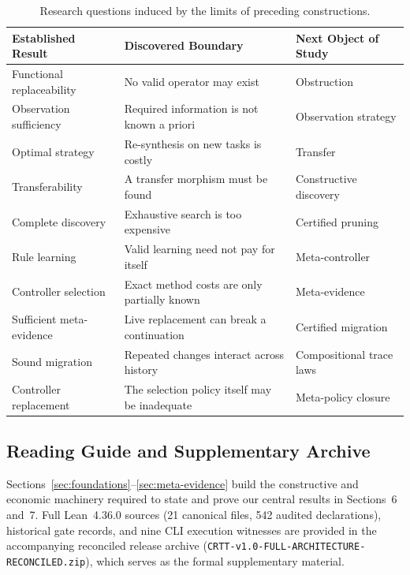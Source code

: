 \documentclass[10pt,letterpaper]{article}
\begin{document}
\begin{table}[h]
\centering
\footnotesize
\begin{tabular}{@{}p{3.6cm}p{5.2cm}p{4.6cm}@{}}
\toprule
\textbf{Established Result} & \textbf{Discovered Boundary} & \textbf{Next Object of Study} \\
\midrule
Functional replaceability & No valid operator may exist & Obstruction \\
Observation sufficiency & Required information is not known a priori & Observation strategy \\
Optimal strategy & Re-synthesis on new tasks is costly & Transfer \\
Transferability & A transfer morphism must be found & Constructive discovery \\
Complete discovery & Exhaustive search is too expensive & Certified pruning \\
Rule learning & Valid learning need not pay for itself & Meta-controller \\
Controller selection & Exact method costs are only partially known & Meta-evidence \\
Sufficient meta-evidence & Live replacement can break a continuation & Certified migration \\
Sound migration & Repeated changes interact across history & Compositional trace laws \\
Controller replacement & The selection policy itself may be inadequate & Meta-policy closure \\
\bottomrule
\end{tabular}
\caption{Research questions induced by the limits of preceding constructions.}
\label{tab:genesis}
\end{table}

\subsection{Reading Guide and Supplementary Archive}
Sections~\ref{sec:foundations}--\ref{sec:meta-evidence} build the constructive and economic machinery required to state and prove our central results in Sections~6 and~7. Full Lean~4.36.0 sources (21 canonical files, 542 audited declarations), historical gate records, and nine CLI execution witnesses are provided in the accompanying reconciled release archive (\texttt{CRTT-v1.0-FULL-ARCHITECTURE-RECONCILED.zip}), which serves as the formal supplementary material.

\end{document}
